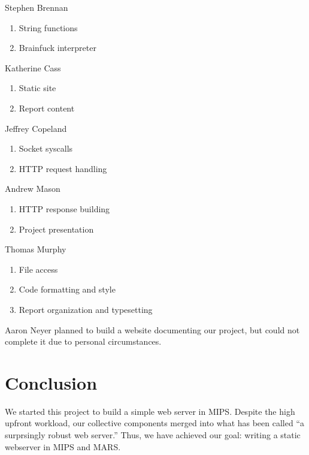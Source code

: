 \documentclass[journal,10pt]{IEEEtran}
\begin{document}
\begin{LaTeXitemize} \itemsep0pt \parskip0pt
  \item Stephen Brennan
  \begin{enumerate}
    \item String functions
    \item Brainfuck interpreter
  \end{enumerate}

  \item Katherine Cass
  \begin{enumerate}
    \item Static site
    \item Report content
  \end{enumerate}

  \item Jeffrey Copeland
  \begin{enumerate}
    \item Socket syscalls
    \item HTTP request handling
  \end{enumerate}

  \item Andrew Mason
  \begin{enumerate}
    \item HTTP response building
    \item Project presentation
  \end{enumerate}

  \item Thomas Murphy
  \begin{enumerate}
    \item File access
    \item Code formatting and style
    \item Report organization and typesetting
  \end{enumerate}

\end{LaTeXitemize}

Aaron Neyer planned to build a website documenting our project, but could not
complete it due to personal circumstances.

\section{Conclusion}

We started this project to build a simple web server in MIPS. Despite the high
upfront workload, our collective components merged into what has been called ``a
surprsingly robust web server.'' Thus, we have achieved our goal: writing a
static webserver in MIPS and MARS.
\end{document}
